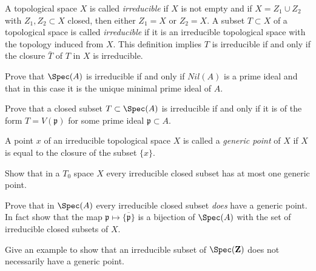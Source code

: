 \begin{definition}
\label{definition-irreducible}
A topological space $X$ is called {\it irreducible} if $X$ is not empty
and if $X = Z_1\cup Z_2$ with $Z_1, Z_2\subset X$ closed, then either
$Z_1 = X$ or $Z_2 = X$. A subset $T\subset X$ of a topological space
is called {\it irreducible} if it is an irreducible
topological space with the topology induced from $X$.
This definition implies $T$ is irreducible if and only
if the closure $\bar T$ of $T$ in $X$ is irreducible.
\end{definition}

\begin{exercise}
\label{exercise-irreducible-spec}
Prove that $\Spec(A)$ is irreducible if and only if
$Nil(A)$ is a prime ideal and that in this case it is the unique
minimal prime ideal of $A$.
\end{exercise}

\begin{exercise}
\label{exercise-irreducible-prime}
Prove that a closed subset $T\subset \Spec(A)$
is irreducible if and only if it is of the form $T = V({\mathfrak p})$ for
some prime ideal ${\mathfrak p}\subset A$.
\end{exercise}

\begin{definition}
\label{definition-generic-point}
A point $x$ of an irreducible topological space $X$ is called
a {\it generic point} of $X$ if $X$ is equal to the closure of
the subset $\{x\}$.
\end{definition}

\begin{exercise}
\label{exercise-irreducible-T0-at-most-one-generic}
Show that in a $T_0$ space $X$ every irreducible closed
subset has at most one generic point.
\end{exercise}

\begin{exercise}
\label{exercise-spec-sober}
Prove that in $\Spec(A)$ every
irreducible closed subset {\it does} have a generic point.
In fact show that the map
${\mathfrak p} \mapsto \overline{\{{\mathfrak p}\}}$ is
a bijection of $\Spec(A)$ with the set of irreducible closed
subsets of $X$.
\end{exercise}

\begin{exercise}
\label{exercise-irreducible-subset-not-generic}
Give an example to show that an irreducible
subset of $\Spec(\mathbf{Z})$ does not necessarily have a generic point.
\end{exercise}

